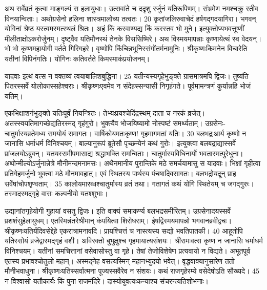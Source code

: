 अथ सर्वेव्रतं कृत्वा माङ्गल्यं स हलायुधाः।
 उत्सवांते च ददृशु रर्जुनं यतिरूपिणम्।
 संभ्रमेण नमश्चक्रु रतीव विनयान्विताः।
 अथोग्रसेनो हलिना शास्त्रमालोच्य तत्वतः।
 20 कृतांजलिरुवाचेदं हर्षगद्गदयागिरा।
 भगवन् योगिनां श्रेष्ठ यस्त्वमस्मत्स्थलं श्रितः।
 अहं किं करवाण्यद्य किं करस्तव भो मुने।
 इत्युक्तोप्यभवत्तूष्णीं मीलीताक्षोऽकरोर्जुनम्।
 दृष्ट्वैव यतिमौनस्थं तेनके विससिष्मिरे।
 अथ विस्मयमापन्नाः कृष्णायेत्थं स्व वेदयन्।
 भो भो कृष्णमहायोगी वर्तते गिरिगहरे।
 वृष्णोपि किंचिन्नभूनिस्संगोंतर्मनामुनिः।
 श्रीकृष्णःकिमनेन विचारेति यतीनां विपिनंगतिः।
 योगिनः कतिवर्तते किमस्माकंप्रयोजनम्।
 
यादवाः
इत्थं वत्स न वक्तव्यं त्वयाबालिशबुद्धिना।
 25 यतीन्यस्यगृहेभुङ्क्ते ग्रासमात्रमपि द्विजः।
 तुष्यंति पितरस्सर्वे योलोकास्सहेश्वराः।
 श्रीकृष्णःएवमेव न संदेहस्सन्यासी निगृहंगते।
 पूर्वमामन्त्रणं कुर्यान्नहि भोजं यतिम्।
 
एकभिक्षाशनंभुङ्क्ते यतिःपूर्वं नियन्त्रितः।
 तेभ्यःप्रयश्चेदिंद्रस्थम् दाता च नरकं व्रजेत्।
 अतस्स्वयतिमागच्छेद्यतिरस्मद् गृहंगुरो।
 भुक्त्यैव भोजयिष्यामो नोस्पष्टं समर्थ्यताम्।
 उग्रसेनः- चातुर्मास्यव्रतेमध्य समयोयं समागतः।
 वार्षिकोयमतःकृष्ण! गृहमागमतां यतिः।
 30 बलभद्रःआर्य कृष्णो न जानासि धर्माधर्म विनिश्चयम्।
 बाल्यानुरूपं ब्रूतेसौ पृच्छन्येनं कथं गुरोः।
 इत्युक्त्वा बलबद्राद्यास्सर्वे प्रांजलयोऽब्रुवन्।
 यतयस्समीपमासाद्य श्रद्धाभक्ति समन्विताः।
 चातुर्मास्यविधिनार्यो भवतास्मत्पुरेधुना।
 अथोन्मील्योऽर्जुनान्नेत्रे मौनीमन्दमनामसः।
 अथैनमानीय पुरान्तिके मठे समर्चयामासु स यादवाः।
 भिक्षां गृहीत्वा प्रतिगेहमर्जुनो भुक्त्वा मठे मौनमावहात्।
 एवं स्थितस्य पार्थस्य पंचषादिवसागतः।
 बलभद्रोयदून् प्राह सर्वेषांचोपशृण्वताम्।
 35 कालोयमारब्धश्चातुर्मास्य व्रतं तथा।
 गतागतं कथं योगि स्थितेयम् च जगद्गुरुः।
 तस्मादस्मद्गृहे वासः कल्पनीयो यतश्शुभाः।
 
उद्यानांतगृहेयोगी गुहायां वसतु द्विजः।
 इति वाक्यं समाकर्ण्य बलभद्रसमीरितम्।
 उग्रसेनादयस्सर्वे प्रशशंसुहेलायुधम्।
 एतस्मिन्नंतरेश्रीमान् कंपयित्वा शिरोधराम्।
 ईषद्विस्मयमापन्नो भगवानब्रवीद्वचः।
 श्रीकृष्णःयतिर्यदिवसेद्देहे एकरात्रामनावदि।
 प्रायश्चित्तं च नास्त्यस्य सद्यो भवतिपातकी।
 40 आहूतोपि यतिस्सोयं व्रजेद्वास्मद्गृहं वशी।
 अविरक्तो बुभुक्षुश्च गृहमायात्यसंशयः।
 श्रीरामःवत्स कृष्ण न जानासि धर्माधर्म विनिश्चयम्।
 यतीनां समचित्तानां वसेवासोस्तु वा गृहे।
 तेषां तेजोविशेषेण प्रत्यवायो न विद्यते।
 अभूतपूर्व एतस्य प्रभावश्चोतुलो महान्।
 अस्मद्नेह वसत्यस्मिन् महानभ्युदयो भवेत्।
 वृद्धवाक्यानुसारेण ततो मौनीभवाधुना।
 श्रीकृष्णःयतिस्सर्वात्मना पूज्यस्सवैरेव न संशयः।
 कथं राजगृहेरम्ये वसेदेषोऽति सौख्यदे।
 45 न विश्वासो यतौकार्यः किं पुना राजमंदिरे।
 दास्योयुवत्यःकन्याश्च संचरन्त्यतिशोभनाः।
 
